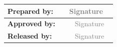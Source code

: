 \vfill

\begin{center}
  \begin{tabularx}{\textwidth}{|l|X|c|}
    \hline
    {\bf \small Prepared by:} &  \ESOowner{}                & \hspace{0.5cm} \textcolor{gray}{Signature} \hspace{0.5cm} \ \\[0.8cm] \hline
    {\bf \small Approved by:} &  \ESOapprovedby{}           &                \textcolor{gray}{Signature}                  \\[0.8cm] \hline
    {\bf \small Released by:} &  \ESOreleasedby{}           &                \textcolor{gray}{Signature}                  \\[0.8cm] \hline
  \end{tabularx}
\end{center}


\restoregeometry
